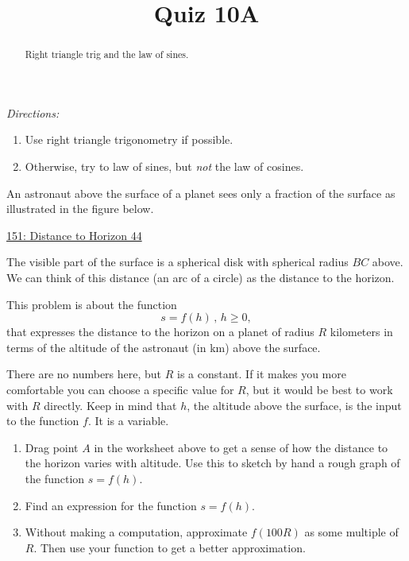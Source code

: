 \documentclass{ximera}
\title{Quiz 10A}
\begin{document}
\begin{abstract}
Right triangle trig and the law of sines.
\end{abstract}
\maketitle



\emph{Directions:}
\begin{enumerate}
\item  Use right triangle trigonometry if possible. 

\item Otherwise, try to law of sines, but \emph{not} the law of cosines. 

\end{enumerate}


\begin{question} \label{ExKdfdKREGER}
An astronaut above the surface of a planet sees only a fraction of the surface as illustrated in the figure below.

\begin{onlineOnly}
    \begin{center}
\end{center}
\end{onlineOnly}

\href{https://www.desmos.com/calculator/8shf1msp4m}{151: Distance to Horizon 44}

The visible part of the surface is a spherical disk with spherical radius $BC$ above. We can think of this distance (an arc of a circle) as the distance to the horizon.

This problem is about the function 
\[
   s = f(h) \, , \, h\geq 0,
\]
that expresses the distance to the horizon on a planet of radius $R$ kilometers in terms of the altitude of the astronaut (in km) above the surface. 

There are no numbers here, but $R$ is a constant. If it makes you more comfortable you can choose a specific value for $R$, but it would be best to work with $R$ directly. Keep in mind that $h$, the altitude above the surface, is the input to the function $f$. It is a variable.

\begin{enumerate}
\item Drag point $A$ in the worksheet above to get a sense of how the distance to the horizon varies with altitude. Use this to sketch by hand a rough graph of the function $s=f(h)$.

\item Find an expression for the function $s=f(h)$.

\item Without making a computation, approximate $f(100R)$ as some multiple of $R$. Then use your function to get a better approximation. 

\end{enumerate} 

\end{question}
\end{document}
